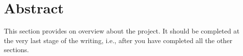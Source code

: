 \section{Abstract}

This section provides on overview about the project. It should be completed at the very last stage of the writing, i.e., after you have completed all the other sections.  